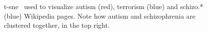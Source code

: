 \documentclass[11pt]{article}
\begin{document}
  \begin{figure}[h]
    \begin{center}
    \end{center}
    \caption{t-sne~\cite{maaten2008visualizing} used to visualize
             autism (red), terrorism (blue) and schizo.* (blue)
             Wikipedia pages. Note how autism and schizophrenia are
             clustered together, in the top right.}
    \label{fig:ast}
  \end{figure}
\end{document}
